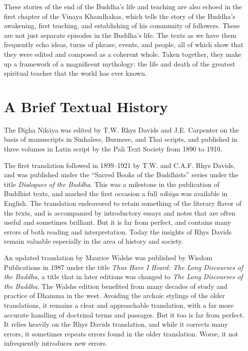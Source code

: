 \documentclass[12pt,openany]{book}%
\begin{document}
These stories of the end of the Buddha’s life and teaching are also echoed in the first chapter of the Vinaya Khandhakas, which tells the story of the Buddha’s awakening, first teaching, and establishing of his community of followers. These are not just separate episodes in the Buddha’s life. The texts as we have them frequently echo ideas, turns of phrase, events, and people, all of which show that they were edited and composed as a coherent whole. Taken together, they make up a framework of a magnificent mythology: the life and death of the greatest spiritual teacher that the world has ever known.

\section*{A Brief Textual History}

The \textsanskrit{Dīgha} \textsanskrit{Nikāya} was edited by T.W. Rhys Davids and J.E. Carpenter on the basis of manuscripts in Sinhalese, Burmese, and Thai scripts, and published in three volumes in Latin script by the Pali Text Society from 1890 to 1910.

The first translation followed in 1899–1921 by T.W. and C.A.F. Rhys Davids, and was published under the “Sacred Books of the Buddhists” series under the title \textit{Dialogues of the Buddha}. This was a milestone in the publication of Buddhist texts, and marked the first occasion a full \textit{\textsanskrit{nikāya}} was available in English. The translation endeavored to retain something of the literary flavor of the texts, and is accompanied by introductory essays and notes that are often useful and sometimes brilliant. But it is far from perfect, and contains many errors of both reading and interpretation. Today the insights of Rhys Davids remain valuable especially in the area of history and society.

An updated translation by Maurice Walshe was published by Wisdom Publications in 1987 under the title \textit{Thus Have I Heard: The Long Discourses of the Buddha}, a title that in later editions was changed to \textit{The Long Discourses of the Buddha}. The Walshe edition benefited from many decades of study and practice of Dhamma in the west. Avoiding the archaic stylings of the older translations, it remains a clear and approachable translation, with a far more accurate handling of doctrinal terms and passages. But it too is far from perfect. It relies heavily on the Rhys Davids translation, and while it corrects many errors, it sometimes repeats errors found in the older translation. Worse, it not infrequently introduces new errors.
\end{document}
